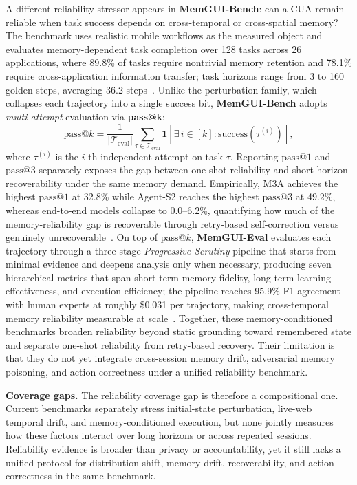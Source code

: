 A different reliability stressor appears in \textbf{MemGUI-Bench}: can a CUA remain reliable when task success depends on cross-temporal or cross-spatial memory? The benchmark uses realistic mobile workflows as the measured object and evaluates memory-dependent task completion over 128 tasks across 26 applications, where 89.8\% of tasks require nontrivial memory retention and 78.1\% require cross-application information transfer; task horizons range from 3 to 160 golden steps, averaging 36.2 steps~\cite{memguibench2026}. Unlike the perturbation family, which collapses each trajectory into a single success bit, \textbf{MemGUI-Bench} adopts \emph{multi-attempt} evaluation via \textbf{pass@k}:
\begin{equation}
\mathrm{pass@}k = \frac{1}{|\mathcal{T}_{\mathrm{eval}}|} \sum_{\tau \in \mathcal{T}_{\mathrm{eval}}} \mathbf{1}\!\left[\exists\, i \in [k] : \mathrm{success}(\tau^{(i)})\right],
\label{eq:passk}
\end{equation}
where $\tau^{(i)}$ is the $i$-th independent attempt on task $\tau$. Reporting $\mathrm{pass@}1$ and $\mathrm{pass@}3$ separately exposes the gap between one-shot reliability and short-horizon recoverability under the same memory demand. Empirically, M3A achieves the highest $\mathrm{pass@}1$ at 32.8\% while Agent-S2 reaches the highest $\mathrm{pass@}3$ at 49.2\%, whereas end-to-end models collapse to 0.0--6.2\%, quantifying how much of the memory-reliability gap is recoverable through retry-based self-correction versus genuinely unrecoverable~\cite{memguibench2026}. On top of $\mathrm{pass@}k$, \textbf{MemGUI-Eval} evaluates each trajectory through a three-stage \emph{Progressive Scrutiny} pipeline that starts from minimal evidence and deepens analysis only when necessary, producing seven hierarchical metrics that span short-term memory fidelity, long-term learning effectiveness, and execution efficiency; the pipeline reaches 95.9\% F1 agreement with human experts at roughly \$0.031 per trajectory, making cross-temporal memory reliability measurable at scale~\cite{memguibench2026}. Together, these memory-conditioned benchmarks broaden reliability beyond static grounding toward remembered state and separate one-shot reliability from retry-based recovery. Their limitation is that they do not yet integrate cross-session memory drift, adversarial memory poisoning, and action correctness under a unified reliability benchmark.

\textbf{Coverage gaps.} The reliability coverage gap is therefore a compositional one. Current benchmarks separately stress initial-state perturbation, live-web temporal drift, and memory-conditioned execution, but none jointly measures how these factors interact over long horizons or across repeated sessions. Reliability evidence is broader than privacy or accountability, yet it still lacks a unified protocol for distribution shift, memory drift, recoverability, and action correctness in the same benchmark.

